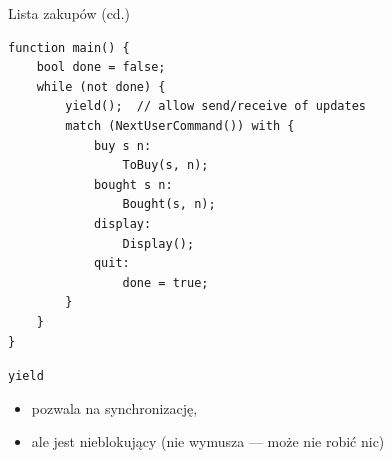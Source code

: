 \documentclass{beamer}
\begin{document}
\begin{frame}[fragile]{Lista zakupów (cd.)}
    \begin{card}
        \begin{lstlisting}
function main() {
    bool done = false;
    while (not done) {
        yield();  // allow send/receive of updates
        match (NextUserCommand()) with {
            buy s n:
                ToBuy(s, n);
            bought s n:
                Bought(s, n);
            display:
                Display();
            quit:
                done = true;
        }
    }
}
        \end{lstlisting}
    \end{card}
\end{frame}

\begin{frame}{\texttt{yield}}
    \begin{card}
        \begin{itemize}[<+->]
            \item pozwala na synchronizację,
            \item ale jest nieblokujący (nie wymusza --- może nie robić nic)
        \end{itemize}
    \end{card}
\end{frame}
\end{document}
